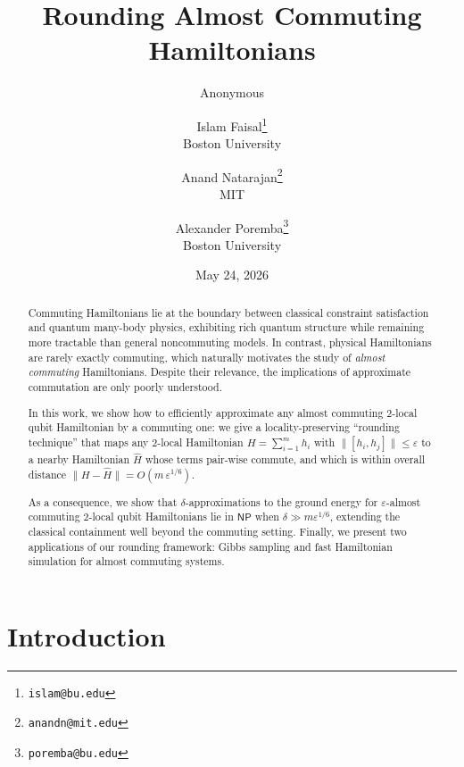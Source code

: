\documentclass[11pt]{article}
\title{Rounding Almost Commuting Hamiltonians}
\author{Anonymous}
\date{}
\author{Islam Faisal\thanks{\texttt{islam@bu.edu}}\\\small{Boston University} \and Anand Natarajan\thanks{\texttt{anandn@mit.edu}}\\\small{MIT}\and Alexander Poremba\thanks{\texttt{poremba@bu.edu}}\\\small{Boston University}}
\date{May 24, 2026}
\theoremstyle{plain}
\newcommand{\eps}{\varepsilon}
\begin{document}
\maketitle

\begin{abstract}
Commuting Hamiltonians lie at the boundary between classical constraint satisfaction and quantum many-body physics, exhibiting rich quantum structure while remaining more tractable than general noncommuting models.  In contrast, physical Hamiltonians are rarely exactly commuting,
which naturally motivates the study of \emph{almost commuting} Hamiltonians. Despite their relevance, the implications of approximate commutation are only poorly understood.

In this work, we show how to efficiently approximate any almost commuting $2$-local qubit Hamiltonian by a commuting one: we give a locality-preserving ``rounding technique'' that maps any $2$-local Hamiltonian $H=\sum_{i=1}^m h_i$ with $\|[h_i,h_j]\| \leq \eps$ to a nearby Hamiltonian
$\hat{H}$ whose terms pair-wise commute, and which is within overall distance
$\|H-\hat{H}\| = O(m\,\eps^{1/6})$.  

As a consequence, we show that $\delta$-approximations to the ground energy for
$\eps$-almost commuting $2$-local qubit Hamiltonians
lie in $\mathsf{NP}$ when $\delta \gg m\eps^{1/6}$, extending the classical containment well
beyond the commuting setting.   Finally, we present two applications of our rounding framework: Gibbs sampling and fast Hamiltonian simulation for almost commuting systems.
\end{abstract}



\section{Introduction}
\label{sec:introduction}
\end{document}
